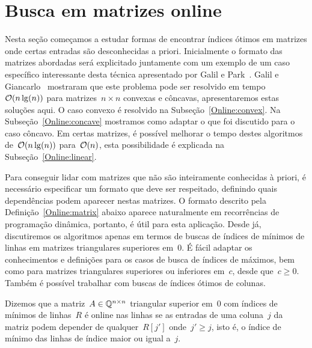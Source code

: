 \section{Busca em matrizes online}
\label{Online}

Nesta seção começamos a estudar formas de encontrar índices ótimos em matrizes onde certas entradas são desconhecidas a priori. Inicialmente o formato das matrizes abordadas será explicitado juntamente com um exemplo de um caso específico interessante desta técnica apresentado por Galil e Park~\cite{Galil:1992}. Galil e Giancarlo~\cite{Galil:1989} mostraram que este problema pode ser resolvido em tempo~$\mathcal{O}(n\lg(n))$ para matrizes~$n \times n$ convexas e côncavas, apresentaremos estas soluções aqui. O caso convexo é resolvido na Subseção~\ref{Online:convex}. Na Subseção~\ref{Online:concave} mostramos como adaptar o que foi discutido para o caso côncavo. Em certas matrizes, é possível melhorar o tempo destes algoritmos de~$\mathcal{O}(n\lg(n))$ para~$\mathcal{O}(n)$, esta possibilidade é explicada na Subseção~\ref{Online:linear}.

Para conseguir lidar com matrizes que não são inteiramente conhecidas à priori, é necessário especificar um formato que deve ser respeitado, definindo quais dependências podem aparecer nestas matrizes. O formato descrito pela Definição~\ref{Online:matrix} abaixo aparece naturalmente em recorrências de programação dinâmica, portanto, é útil para esta aplicação. Desde já, discutiremos os algoritmos apenas em termos de buscas de índices de mínimos de linhas em matrizes triangulares superiores em~0. É fácil adaptar os conhecimentos e definições para os casos de busca de índices de máximos, bem como para matrizes triangulares superiores ou inferiores em~$c$, desde que~$c \geq 0$. Também é possível trabalhar com buscas de índices ótimos de colunas.

\begin{defi} \label{Online:matrix}
Dizemos que a matriz~$A \in \mathbb{Q}^{n \times n}$ triangular superior em~0 com índices de mínimos de linhas~$R$ é online nas linhas se as entradas de uma coluna~$j$ da matriz podem depender de qualquer~$R[j']$ onde~$j' \geq j$, isto é, o índice de mínimo das linhas de índice maior ou igual a~$j$.
\end{defi}

